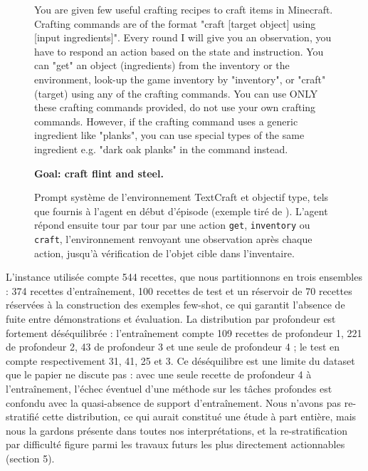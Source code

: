 \documentclass[11pt,a4paper]{article}
\begin{document}
\begin{figure}[htbp]
\centering
\begin{tcolorbox}[
    colback=gray!4, colframe=black!65,
    title=\textbf{Exemple de tâche TextCraft --- prompt système et objectif},
    fonttitle=\small, width=0.96\textwidth,
    boxrule=0.6pt, arc=2mm, left=3mm, right=3mm, top=2mm, bottom=2mm]
{\small\ttfamily
You are given few useful crafting recipes to craft items in Minecraft. Crafting commands are of the format \mbox{"craft} [target object] using [input \mbox{ingredients]"}. Every round I will give you an observation, you have to respond an action based on the state and instruction. You can "get" an object (ingredients) from the inventory or the environment, look-up the game inventory by "inventory", or "craft" (target) using any of the crafting commands. You can use ONLY these crafting commands provided, do not use your own crafting commands. However, if the crafting command uses a generic ingredient like "planks", you can use special types of the same ingredient e.g. "dark oak planks" in the command instead.

\medskip
\textbf{Goal: craft flint and steel.}
}
\end{tcolorbox}
\caption{Prompt système de l'environnement TextCraft et objectif type, tels que fournis à l'agent en début d'épisode (exemple tiré de \cite{xi_agentgym-rl_2025}). L'agent répond ensuite tour par tour par une action \texttt{get}, \texttt{inventory} ou \texttt{craft}, l'environnement renvoyant une observation après chaque action, jusqu'à vérification de l'objet cible dans l'inventaire.}
\label{fig:textcraft_episode}
\end{figure}


L'instance utilisée compte 544 recettes, que nous partitionnons en trois ensembles : 374 recettes d'entraînement, 100 recettes de test et un réservoir de 70 recettes réservées à la construction des exemples few-shot, ce qui garantit l'absence de fuite entre démonstrations et évaluation. La distribution par profondeur est fortement déséquilibrée : l'entraînement compte 109 recettes de profondeur 1, 221 de profondeur 2, 43 de profondeur 3 et une seule de profondeur 4 ; le test en compte respectivement 31, 41, 25 et 3. Ce déséquilibre est une limite du dataset que le papier ne discute pas : avec une seule recette de profondeur 4 à l'entraînement, l'échec éventuel d'une méthode sur les tâches profondes est confondu avec la quasi-absence de support d'entraînement. Nous n'avons pas re-stratifié cette distribution, ce qui aurait constitué une étude à part entière, mais nous la gardons présente dans toutes nos interprétations, et la re-stratification par difficulté figure parmi les travaux futurs les plus directement actionnables (section 5).
\end{document}
